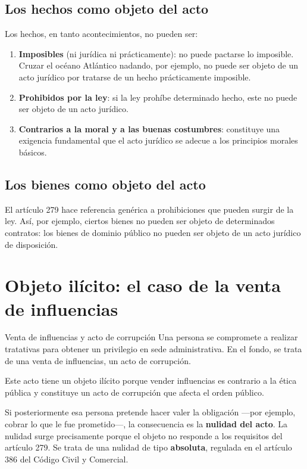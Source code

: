 \documentclass[12pt,oneside]{book}
\begin{document}
\subsection{Los hechos como objeto del acto}

Los hechos, en tanto acontecimientos, no pueden ser:

\begin{enumerate}
    \item \textbf{Imposibles} (ni jurídica ni prácticamente): no puede pactarse lo imposible. Cruzar el océano Atlántico nadando, por ejemplo, no puede ser objeto de un acto jurídico por tratarse de un hecho prácticamente imposible.
    \item \textbf{Prohibidos por la ley}: si la ley prohíbe determinado hecho, este no puede ser objeto de un acto jurídico.
    \item \textbf{Contrarios a la moral y a las buenas costumbres}: constituye una exigencia fundamental que el acto jurídico se adecue a los principios morales básicos.
\end{enumerate}

\subsection{Los bienes como objeto del acto}

El artículo 279 hace referencia genérica a prohibiciones que pueden surgir de la ley. Así, por ejemplo, ciertos bienes no pueden ser objeto de determinados contratos: los bienes de dominio público no pueden ser objeto de un acto jurídico de disposición.

\section{Objeto ilícito: el caso de la venta de influencias}

\begin{example}{Venta de influencias y acto de corrupción}
Una persona se compromete a realizar tratativas para obtener un privilegio en sede administrativa. En el fondo, se trata de una venta de influencias, un acto de corrupción.

Este acto tiene un objeto ilícito porque vender influencias es contrario a la ética pública y constituye un acto de corrupción que afecta el orden público.

Si posteriormente esa persona pretende hacer valer la obligación —por ejemplo, cobrar lo que le fue prometido—, la consecuencia es la \textbf{nulidad del acto}. La nulidad surge precisamente porque el objeto no responde a los requisitos del artículo 279. Se trata de una nulidad de tipo \textbf{absoluta}, regulada en el artículo 386 del Código Civil y Comercial.
\end{example}
\end{document}
